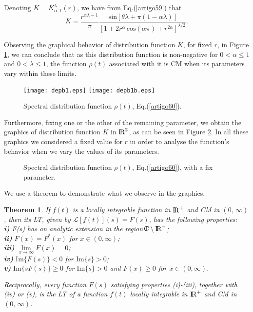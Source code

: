 \documentclass[12pt]{amsart}
\newcommand{\cplex}{{\rm I\hspace{-6pt}C}}
\numberwithin{equation}{section}
\newtheorem{teo}{Theorem}[section]
\newcommand{\real}{{\rm I\!R}}
\renewcommand{\sin}{\hspace{2pt}\textrm{sin}}
\renewcommand{\cos}{\hspace{2pt}\textrm{cos}}
\begin{document}
Denoting $K=K_{\alpha,1}^{\lambda}(r)$, we have from Eq.(\ref{artigo59}) that 
\begin{equation} K=\frac{r^{\alpha
\lambda-1}}{\pi}\frac{\sin[\theta \lambda+\pi(1-\alpha
\lambda)]}{[1+2r^{\alpha}\cos(\alpha\pi)+ r^{2\alpha}]^{\lambda
/2}}.  \label{artigo60}
\end{equation}
	
Observing the graphical behavior of distribution function $K$, for fixed $r$,
in Figure \ref{casopare}, we can conclude that as this distribution function is
non-negative for $0<\alpha\leq1$ and $0<\lambda\leq1$, the function $\rho(t)$
associated with it is CM when its parameters vary within these limits. 

\begin{figure}[H]
\begin{center}
\texttt{[image: depb1.eps]} \qquad
\texttt{[image: depb1b.eps]}
\caption{Spectral distribution function 
$\rho(t)$, Eq.(\ref{artigo60}).}
\label{casopare}
\end{center}
\end{figure}
	
Furthermore, fixing one or the other of the remaining parameter, we obtain the graphics of
distribution function $K$ in $\real^{2}$, as can be seen in Figure \ref{casosparame}. In all
these graphics we considered a fixed value for $r$ in order to analyse the function's behavior
when we vary the values of its parameters. 

\begin{figure}[H] \center
		\qquad
		\caption{Spectral distribution function $\rho(t)$,
		Eq.(\ref{artigo60}), with a fix parameter.} \label{casosparame}
\end{figure}
We use a theorem to demonstrate what we observe in the graphics. 

\begin{teo}
	
If $f(t)$ is a locally integrable function in $\real^{+}$ and {\rm{CM}} in $(0,\,\infty)$,
then its {\rm{LT}}, given by $\mathscr{L}[f(t)](s)=F(s)$, has the following properties: \\

\textbf{i)}
F(s) has an analytic extension in the region $\cplex \setminus \real^{-}$;\\
\textbf{ii)} $F(x) =  F^{*}(x)$ for $x \in (0,\infty)$;\\
\textbf{iii)} $\underset{x \rightarrow \infty}{\lim} F(x)=0$;\\
\textbf{iv)} $\mbox{Im}\{F(s)\}< 0$ for $\mbox{Im}\{s\} > 0$;\\
\textbf{v)} $\mbox{Im}\{sF(s)\}\geq0$ for $\mbox{Im}\{s\} > 0$ and $F(x)\geq 0$ for $x\in (0,
	\infty)$.
	
Reciprocally, every function $F(s)$ satisfying properties (i)-(iii), together with (iv) or (v),
	is the  {\rm{LT}} of a function $f(t)$ locally integrable in $\real^{+}$  and {\rm{CM}}
	in $(0,\,\infty)$.  \label{teoremaimportante}
\end{teo}
	
\end{document}
